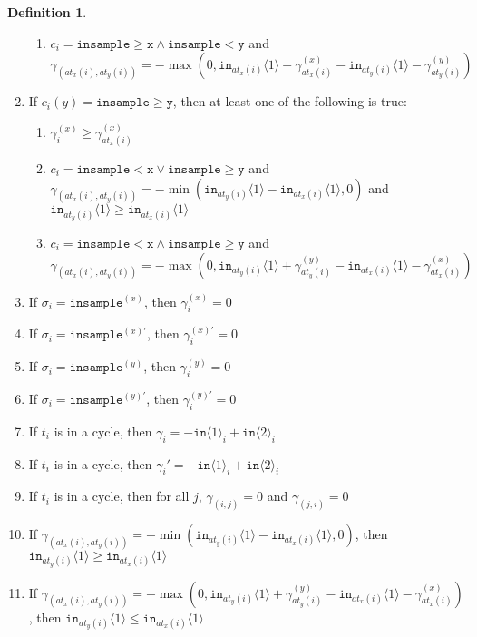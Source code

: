 \documentclass[12pt]{article}
\newcommand{\gguard}[1][x]{\texttt{insample}\geq#1}
\newcommand{\lguard}[1][x]{\texttt{insample} < #1}
\newcommand{\brangle}[1]{\langle#1 \rangle}
\theoremstyle{definition}
\newtheorem{defn}[thm]{Definition}
\begin{document}
\begin{defn}
\begin{enumerate}
\begin{enumerate}
            \item $c_i = \gguard[\texttt{x}]\land\lguard[\texttt{y}]$ and $\gamma_{(at_x(i), at_y(i))} = -\max(0, \texttt{in}_{at_x(i)}\brangle{1}+ \gamma_{at_x(i)}^{(x)}-\texttt{in}_{at_y(i)}\brangle{1}-\gamma_{at_y(i)}^{(y)})$
        \end{enumerate}
        \item If $c_i(y) = \gguard[\texttt{y}]$, then at least one of the following is true: \begin{enumerate}
            \item $\gamma_i^{(x)}\geq \gamma^{(x)}_{at_x(i)}$
            \item $c_i = \lguard[\texttt{x}]\lor\gguard[\texttt{y}]$ and $\gamma_{(at_x(i), at_y(i))} = -\min(\texttt{in}_{at_y(i)}\brangle{1}-\texttt{in}_{at_x(i)}\brangle{1}, 0)$ and $\texttt{in}_{at_y(i)}\brangle{1}\geq \texttt{in}_{at_x(i)}\brangle{1}$
            \item $c_i = \lguard[\texttt{x}]\land\gguard[\texttt{y}]$ and $\gamma_{(at_x(i), at_y(i))} = -\max(0, \texttt{in}_{at_y(i)}\brangle{1}+ \gamma_{at_y(i)}^{(y)}-\texttt{in}_{at_x(i)}\brangle{1}-\gamma_{at_x(i)}^{(x)})$
        \end{enumerate}
        \item If $\sigma_i = \texttt{insample}^{(x)}$, then $\gamma_i^{(x)}=0$
        \item If $\sigma_i = \texttt{insample}^{(x)\prime}$, then $\gamma_i^{(x)\prime}=0$
        \item If $\sigma_i = \texttt{insample}^{(y)}$, then $\gamma_i^{(y)}=0$
        \item If $\sigma_i = \texttt{insample}^{(y)\prime}$, then $\gamma_i^{(y)\prime}=0$
        \item If $t_i$ is in a cycle, then $\gamma_i = -\texttt{in}\brangle{1}_i+\texttt{in}\brangle{2}_i$
        \item If $t_i$ is in a cycle, then $\gamma_i' = -\texttt{in}\brangle{1}_i+\texttt{in}\brangle{2}_i$
        \item If $t_i$ is in a cycle, then for all $j$, $\gamma_{(i, j)} = 0$ and $\gamma_{(j, i)} = 0$
        \item If $\gamma_{(at_x(i), at_y(i))} = -\min(\texttt{in}_{at_y(i)}\brangle{1}-\texttt{in}_{at_x(i)}\brangle{1}, 0)$, then $\texttt{in}_{at_y(i)}\brangle{1}\geq \texttt{in}_{at_x(i)}\brangle{1}$
        \item If $\gamma_{(at_x(i), at_y(i))} = -\max(0, \texttt{in}_{at_y(i)}\brangle{1}+ \gamma_{at_y(i)}^{(y)}-\texttt{in}_{at_x(i)}\brangle{1}-\gamma_{at_x(i)}^{(x)})$, then $\texttt{in}_{at_y(i)}\brangle{1}\leq \texttt{in}_{at_x(i)}\brangle{1}$

\end{enumerate}
\end{defn}
\end{document}
